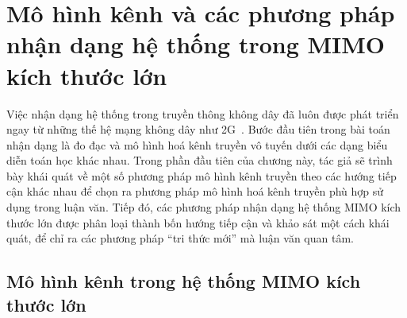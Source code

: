 \clearpage
{}

\setcounter{chapter}{0}
\chapter[MÔ HÌNH KÊNH VÀ CÁC PHƯƠNG PHÁP NHẬN DẠNG HỆ THỐNG TRONG MIMO KÍCH THƯỚC LỚN]{Mô hình kênh và các phương pháp nhận dạng hệ thống trong MIMO kích thước lớn}
\label{sec:back}
Việc nhận dạng hệ thống trong truyền thông không dây đã luôn được phát triển ngay từ những thế hệ mạng không dây như 2G~\cite{Tse2005}. Bước đầu tiên trong bài toán nhận dạng là đo đạc và mô hình hoá kênh truyền vô tuyến dưới các dạng biểu diễn toán học khác nhau. Trong phần đầu tiên của chương này, tác giả sẽ trình bày khái quát về một số phương pháp mô hình kênh truyền theo các hướng tiếp cận khác nhau để chọn ra phương pháp mô hình hoá kênh truyền phù hợp sử dụng trong luận văn. Tiếp đó, các phương pháp nhận dạng hệ thống MIMO kích thước lớn được phân loại thành bốn hướng tiếp cận và khảo sát một cách khái quát, để chỉ ra các phương pháp ``tri thức mới'' mà luận văn quan tâm. 

\section{Mô hình kênh trong hệ thống MIMO kích thước lớn}
\label{sec:channel_model}

